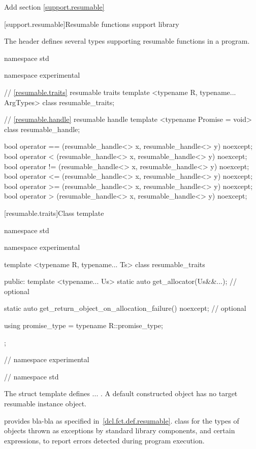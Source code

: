 Add section \ref{support.resumable}

\setcounter{section}{10}
[support.resumable]{Resumable functions support library}

\pnum
The header
\tcode{<experimental/resumable]>}
defines several types supporting resumable functions in a \Cpp program.


%
%
\begin{codeblock}
namespace std {
namespace experimental {
  // \ref{resumable.traits} resumable traits
  template <typename R, typename... ArgTypes>
    class resumable_traits;
	
  // \ref{resumable.handle} resumable handle
  template <typename Promise = void>
    class resumable_handle;		
	
  bool operator == (resumable_handle<> x, resumable_handle<> y) noexcept;
  bool operator < (resumable_handle<> x, resumable_handle<> y) noexcept;			
  bool operator != (resumable_handle<> x, resumable_handle<> y) noexcept;
  bool operator <= (resumable_handle<> x, resumable_handle<> y) noexcept;			
  bool operator >= (resumable_handle<> x, resumable_handle<> y) noexcept;
  bool operator > (resumable_handle<> x, resumable_handle<> y) noexcept;			
}
}
\end{codeblock}

[resumable.traits]{Class template }

%
\begin{codeblock}
namespace std {
namespace experimental {
  template <typename R, typename... Ts>
  class resumable_traits {
  public:
    template <typename... Us>
      static auto get_allocator(Us&&...); // optional
			
    static auto get_return_object_on_allocation_failure() noexcept; // optional
			
    using promise_type = typename R::promise_type;
  };
} // namespace experimental
} // namespace std
\end{codeblock}

\pnum
The struct template  
defines ... .
A default constructed  object has no target 
resumable instance object.

provides bla-bla as specified in~\ref{dcl.fct.def.resumable}.
class for the types of objects thrown as exceptions by
\Cpp standard library components, and certain
expressions, to report errors detected during program execution.

